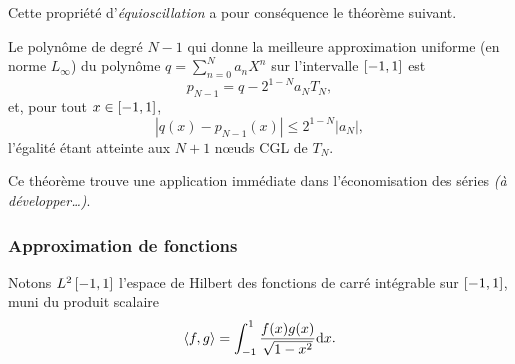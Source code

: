 Cette propriété d'\emph{équioscillation} a pour conséquence le théorème suivant.
\begin{theoreme}
	Le polynôme %
	de degré $N-1$ qui donne la meilleure approximation uniforme (\ie en norme $L_\infty$) %
du polynôme %
$q = \sum_{n=0}^{N} a_n X^n$ 
sur l'intervalle $\left[ -1, 1 \right]$ est
	\begin{equation}
		p_{N-1} = q - 2^{1-N} a_N T_N,
	\end{equation}
	et, pour tout $x \in \left[ -1, 1 \right]$,
	\begin{equation}
		\left| q(x)-  p_{N-1}(x)\right| \leq 2^{1-N} \left| a_N \right|,
	\end{equation}
	l'égalité étant atteinte aux $N+1$ n\oe uds CGL de $T_N$.
\end{theoreme}
Ce théorème trouve une application immédiate dans l'économisation des séries \textit{(à développer\ldots)}.

\subsubsection{Approximation de fonctions}
Notons $L^2\left[ -1, 1 \right]$ l'espace de Hilbert des fonctions de carré intégrable sur $\left[ -1, 1 \right]$, muni du produit scalaire
\begin{equation}
	\left \langle {f}, {g} \right \rangle =
	\int_{-1}^{1} \frac{f(x) g(x)}{\sqrt{1 - x^2}} \mathrm{d}{x} .
	\label{eq:chebyshev_scalar_product}
\end{equation}

